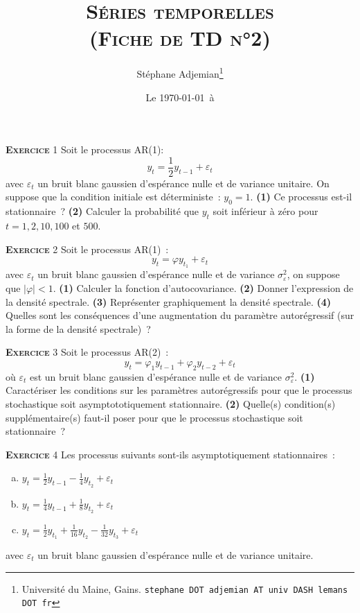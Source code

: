 \documentclass[10pt,a4paper,notitlepage]{article}
\newcommand{\exercice}[1]{\textsc{\textbf{Exercice}} #1}
\newcommand{\question}[1]{\textbf{(#1)}}
\begin{document}
\title{\textsc{Séries temporelles\\ \small{(Fiche de TD n°2)}}}
\author{Stéphane Adjemian\thanks{Université du Maine, Gains. \texttt{stephane DOT adjemian AT univ DASH lemans DOT fr}}}
\date{Le \today\ à \thistime}

\maketitle

\exercice{1} Soit le processus AR(1):
\[
y_t = \frac{1}{2}y_{t-1} + \varepsilon_t
\]
avec ${\varepsilon_t}$ un bruit blanc gaussien d'espérance nulle et de variance unitaire. On suppose que la condition initiale est déterministe : $y_0 = 1$. \question{1} Ce processus est-il stationnaire ? \question{2} Calculer la probabilité que $y_t$ soit inférieur à zéro pour $t=1, 2, 10, 100$ et $500$.
 
\bigskip

\exercice{2} Soit le processus AR(1) :
\[
y_t = \varphi y_{t_1} + \varepsilon_t
\]
avec ${\varepsilon_t}$ un bruit blanc gaussien d'espérance nulle et de variance $\sigma^2_{\varepsilon}$, on suppose que $|\varphi|<1$. \question{1} Calculer la fonction d'autocovariance. \question{2} Donner l'expression de la densité spectrale. \question{3} Représenter graphiquement la densité spectrale. \question{4} Quelles sont les conséquences d'une augmentation du paramètre autorégressif (sur la forme de la densité spectrale) ?

\bigskip

\exercice{3} Soit le processus AR(2) :
\[
y_t = \varphi_1 y_{t-1} + \varphi_2 y_{t-2} + \varepsilon_t
\]
où ${\varepsilon_t}$ est un bruit blanc gaussien d'espérance nulle et de variance $\sigma^2_{\varepsilon}$. \question{1} Caractériser les conditions sur les paramètres autorégressifs pour que le processus stochastique soit asymptototiquement stationnaire. \question{2} Quelle(s) condition(s) supplémentaire(s) faut-il poser pour que le processus stochastique soit stationnaire ? 

\bigskip

\exercice{4} Les processus suivants sont-ils asymptotiquement stationnaires :
\begin{enumerate}[(a)]
	\item $y_t = \frac{1}{2}y_{t-1} - \frac{1}{4} y_{t_2} + \varepsilon_t$
	\item $y_t = \frac{1}{4}y_{t-1} + \frac{1}{8} y_{t_2} + \varepsilon_t$
	\item $y_t = \frac{1}{2}y_{t_1} + \frac{1}{16}y_{t_2} - \frac{1}{32}y_{t_3} + \varepsilon_t$
\end{enumerate}
avec ${\varepsilon_t}$ un bruit blanc gaussien d'espérance nulle et de variance unitaire.
\end{document}
